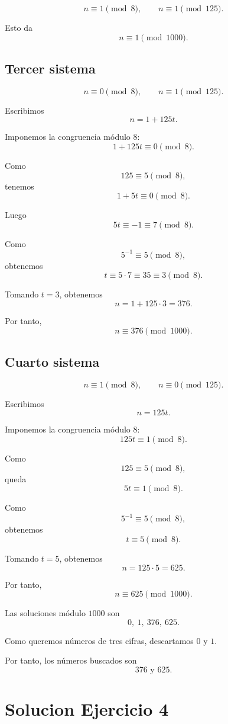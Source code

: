 \documentclass[12pt]{article}
\begin{document}
\[
n\equiv 1\pmod 8,
\qquad
n\equiv 1\pmod {125}.
\]

Esto da
\[
n\equiv 1\pmod {1000}.
\]

\subsection*{Tercer sistema}

\[
n\equiv 0\pmod 8,
\qquad
n\equiv 1\pmod {125}.
\]

Escribimos
\[
n=1+125t.
\]

Imponemos la congruencia módulo \(8\):
\[
1+125t\equiv 0\pmod 8.
\]

Como
\[
125\equiv 5\pmod 8,
\]
tenemos
\[
1+5t\equiv 0\pmod 8.
\]

Luego
\[
5t\equiv -1\equiv 7\pmod 8.
\]

Como
\[
5^{-1}\equiv 5\pmod 8,
\]
obtenemos
\[
t\equiv 5\cdot 7\equiv 35\equiv 3\pmod 8.
\]

Tomando \(t=3\), obtenemos
\[
n=1+125\cdot 3=376.
\]

Por tanto,
\[
n\equiv 376\pmod {1000}.
\]

\subsection*{Cuarto sistema}

\[
n\equiv 1\pmod 8,
\qquad
n\equiv 0\pmod {125}.
\]

Escribimos
\[
n=125t.
\]

Imponemos la congruencia módulo \(8\):
\[
125t\equiv 1\pmod 8.
\]

Como
\[
125\equiv 5\pmod 8,
\]
queda
\[
5t\equiv 1\pmod 8.
\]

Como
\[
5^{-1}\equiv 5\pmod 8,
\]
obtenemos
\[
t\equiv 5\pmod 8.
\]

Tomando \(t=5\), obtenemos
\[
n=125\cdot 5=625.
\]

Por tanto,
\[
n\equiv 625\pmod {1000}.
\]

Las soluciones módulo \(1000\) son
\[
0,\ 1,\ 376,\ 625.
\]

Como queremos números de tres cifras, descartamos \(0\) y \(1\).

Por tanto, los números buscados son
\[
\boxed{376 \text{ y } 625}.
\]

\section*{Solucion Ejercicio 4}
\end{document}
